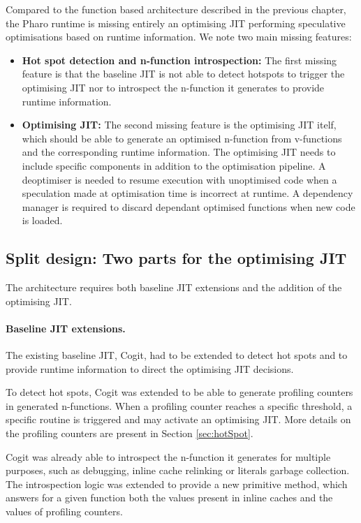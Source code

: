 \documentclass[a4paper,12pt,twoside]{../includes/ThesisStyle}
\begin{document}
Compared to the function based architecture described in the previous chapter, the Pharo runtime is missing entirely an optimising JIT performing speculative optimisations based on runtime information. We note two main missing features:
\begin{itemize}
	\item \textbf{Hot spot detection and n-function introspection:} The first missing feature is that the baseline JIT is not able to detect hotspots to trigger the optimising JIT nor to introspect the n-function it generates to provide runtime information. 
	\item \textbf{Optimising JIT:} The second missing feature is the optimising JIT itelf, which should be able to generate an optimised n-function from v-functions and the corresponding runtime information. The optimising JIT needs to include specific components in addition to the optimisation pipeline. A deoptimiser is needed to resume execution with unoptimised code when a speculation made at optimisation time is incorrect at runtime. A dependency manager is required to discard dependant optimised functions when new code is loaded.
\end{itemize}

\subsection{Split design: Two parts for the optimising JIT}
\label{sec:splitDesign}

The architecture requires both baseline JIT extensions and the addition of the optimising JIT.

\paragraph{Baseline JIT extensions.}
The existing baseline JIT, Cogit, had to be extended to detect hot spots and to provide runtime information to direct the optimising JIT decisions. 

To detect hot spots, Cogit was extended to be able to generate profiling counters in generated n-functions. When a profiling counter reaches a specific threshold, a specific routine is triggered and may activate an optimising JIT. More details on the profiling counters are present in Section \ref{sec:hotSpot}.

Cogit was already able to introspect the n-function it generates for multiple purposes, such as debugging, inline cache relinking or literals garbage collection. The introspection logic was extended to provide a new primitive method, which answers for a given function both the values present in inline caches and the values of profiling counters.
\end{document}
